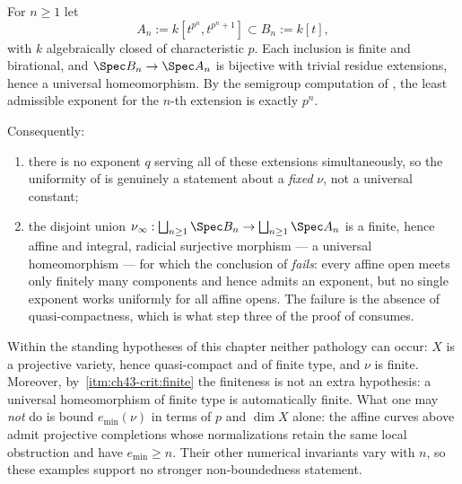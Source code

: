 \begin{example}
\label{ex:ch43-no-uniform-exponent}
For $n\ge1$ let
\[
 A_n:=k[t^{p^n},t^{p^n+1}]\subset B_n:=k[t],
\]
with $k$ algebraically closed of characteristic $p$.  Each inclusion is
finite and birational, and $\Spec B_n\to\Spec A_n$ is bijective with
trivial residue extensions, hence a universal homeomorphism.  By the
semigroup computation of , the least admissible
exponent for the $n$-th extension is exactly $p^n$.

Consequently:
\begin{enumerate}
\item there is no exponent $q$ serving all of these extensions
      simultaneously, so the uniformity of
       is genuinely a statement about a
      \emph{fixed} $\nu$, not a universal constant;
\item the disjoint union
      $\nu_\infty:\bigsqcup_{n\ge1}\Spec B_n\to\bigsqcup_{n\ge1}\Spec A_n$
      is a finite, hence affine and integral, radicial surjective
      morphism --- a universal homeomorphism --- for which the conclusion of
       \emph{fails}: every affine open
      meets only finitely many components and hence admits an exponent, but
      no single exponent works uniformly for all affine opens.  The failure
      is the absence of quasi-compactness, which is what step three of the
      proof of  consumes.
\end{enumerate}

Within the standing hypotheses of this chapter neither pathology can occur:
$X$ is a projective variety, hence quasi-compact and of finite type, and
$\nu$ is finite.  Moreover, by
\,\cref{itm:ch43-crit:finite} the finiteness is not
an extra hypothesis: a universal homeomorphism of finite type is
automatically finite.  What one may \emph{not} do is bound $e_{\min}(\nu)$
in terms of $p$ and $\dim X$ alone: the affine curves above admit
projective completions whose normalizations retain the same local
obstruction and have $e_{\min}\ge n$.  Their other numerical invariants
vary with $n$, so these examples support no stronger non-boundedness
statement.
\end{example}

